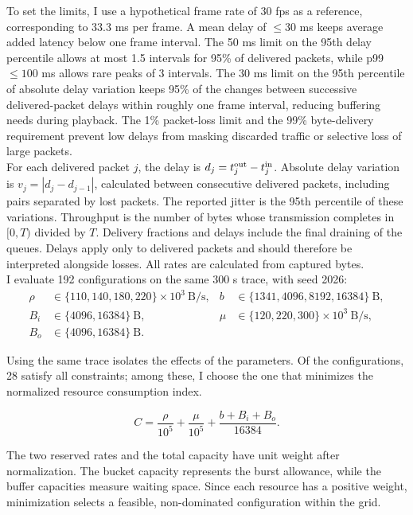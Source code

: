 \documentclass[10pt,a4paper]{article}
\begin{document}
To set the limits, I use a hypothetical frame rate of 30 fps as a reference,
corresponding to 33.3 ms per frame. A mean delay of $\leq30$ ms keeps average added
latency below one frame interval. The 50 ms limit on the 95th delay percentile
allows at most 1.5 intervals for 95\% of delivered packets, while p99 $\leq100$ ms
allows rare peaks of 3 intervals. The 30 ms limit on the 95th percentile of absolute
delay variation keeps 95\% of the changes between successive delivered-packet delays
within roughly one frame interval, reducing buffering needs during playback.
The 1\% packet-loss limit and the 99\% byte-delivery requirement prevent low delays
from masking discarded traffic or selective loss of large packets.\\

For each delivered packet $j$, the delay is $d_j=t_j^{\rm out}-t_j^{\rm in}$.
Absolute delay variation is $v_j=|d_j-d_{j-1}|$, calculated between consecutive
delivered packets, including pairs separated by lost packets. The reported jitter
is the 95th percentile of these variations. Throughput is the number of bytes
whose transmission completes in $[0,T)$ divided by $T$. Delivery fractions and
delays include the final draining of the queues. Delays apply only to delivered
packets and should therefore be interpreted alongside losses. All rates are
calculated from captured bytes.\\

I evaluate 192 configurations on the same 300 s trace, with seed 2026:
\begin{equation}
    \begin{aligned}
\rho&\in\{110,140,180,220\}\times10^3\ \mathrm{B/s},&
b&\in\{1341,4096,8192,16384\}\ \mathrm{B},\\
B_i&\in\{4096,16384\}\ \mathrm{B},&
\mu&\in\{120,220,300\}\times10^3\ \mathrm{B/s},\\
B_o&\in\{4096,16384\}\ \mathrm{B}.&&
\end{aligned}
\end{equation}

Using the same trace isolates the effects of the parameters. Of the configurations,
28 satisfy all constraints; among these, I choose the one that minimizes the
normalized resource consumption index.

\begin{equation}
    C=\frac{\rho}{10^5}+\frac{\mu}{10^5}+\frac{b+B_i+B_o}{16384}.
\end{equation}

The two reserved rates and the total capacity have unit weight after normalization.
The bucket capacity represents the burst allowance, while the buffer capacities
measure waiting space. Since each resource has a positive weight, minimization
selects a feasible, non-dominated configuration within the grid.\\
\end{document}

